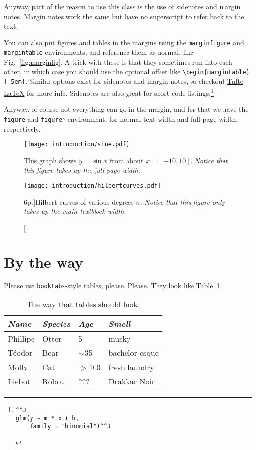 Anyway, part of the reason to use this class is the use of sidenotes and margin notes. Margin notes work the same but have no superscript to refer back to the text.

You can also put figures and tables in the margins using the \texttt{marginfigure} and \texttt{margintable} environments, and reference them as normal, like Fig.~\ref{fig:marginfig}. A trick with these is that they sometimes run into each other, in which case you should use the optional offset like \verb|\begin{margintable}[-5em]|. Similar options exist for sidenotes and margin notes, so checkout \href{https://ctan.org/pkg/tufte-latex}{Tufte LaTeX} for more info. Sidenotes are also great for short code listings.\footnote{\vspace{-1em}\begin{lstlisting}^^J
glm(y ~ m * x + b, 
    family = "binomial")^^J
\end{lstlisting}
}

Anyway, of course not everything can go in the margin, and for that we have the \texttt{figure} and \texttt{figure*} environment, for normal text width and full page width, respectively.
\begin{figure*}[h]
  \texttt{[image: introduction/sine.pdf]}%
  \caption{This graph shows $y = \sin x$ from about $x = [-10, 10]$.
  \emph{Notice that this figure takes up the full page width.}}%
  \label{fig:fullfig}%
\end{figure*}

\begin{figure}
  \texttt{[image: introduction/hilbertcurves.pdf]}
  \caption[Hilbert curves of various degrees $n$.][6pt]{Hilbert curves of various degrees $n$. \emph{Notice that this figure only takes up the main textblock width.}}
  \label{fig:textfig}
\end{figure}

\section{By the way}

Please use \texttt{booktabs}-style tables, please. Please. They look like Table~\ref{tab:example}.

\begin{table}[h]
\centering
\begin{tabular}{l l l l}
\toprule
\textit{Name}	& \textit{Species}	& \textit{Age}	& \textit{Smell}	\\
\midrule
Phillipe		& Otter				& 5			& musky					\\ \rowcolor{lightgray}
T\'{e}odor		& Bear				& $\sim$35	& bachelor-esque		\\
Molly			& Cat				& $>$100	& fresh laundry			\\ \rowcolor{lightgray}
Liebot			& Robot				& ???		& Drakkar Noir			\\
\bottomrule
\end{tabular}
\caption{The way that tables should look.}
\label{tab:example}
\end{table}


